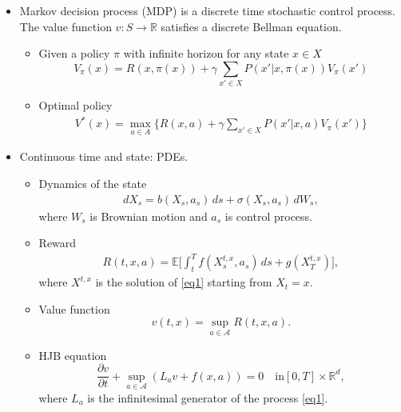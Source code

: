\documentclass{beamer}
\begin{document}
\begin{frame}
\begin{itemize}
\item Markov decision process (MDP) is a discrete time stochastic control process.   The value function $v:S\to \mathbb{R}$ satisfies a discrete Bellman equation.
\pause
\begin{itemize}
\item Given a policy $\pi$ with infinite horizon for any state $x\in X$
\begin{equation*}
V_\pi(x) = R(x,\pi(x)) + \gamma\sum_{x'\in X}P(x'|x,\pi(x))V_{\pi}(x')
\end{equation*}
\item Optimal policy
\begin{align*}
V^\ast(x) = \max_{a\in A}\{R(x,a) + \gamma\sum_{x'\in X}P(x'|x,a)V_{\pi}(x')\}
\end{align*}
\end{itemize}

\end{itemize} 
\end{frame}

\begin{frame}
\begin{itemize}
\item Continuous time and state: PDEs. 
\begin{itemize}
\item Dynamics of the state
\begin{align}\label{eq1}
dX_s = b(X_s,a_s)\,ds + \sigma(X_s,a_s)\,dW_s,
\end{align}
where $W_s$ is Brownian motion and $a_s$ is control process.
\pause
\item Reward 
\begin{align*}
R(t,x,a) = \mathbb{E}\big[\int_t^Tf(X_s^{t,x},a_s)\,ds + g(X_T^{t,x})\big],
\end{align*}
where $X^{t,x}$ is the solution of \eqref{eq1} starting from $X_t = x$.
\pause
\item Value function 
$$v(t,x) = \sup_{a\in \mathcal{A}}R(t,x,a).$$
\pause
\item HJB equation 
$$\frac{\partial v}{\partial t} + \sup_{a\in \mathcal{A}}(L_a v + f(x,a)) = 0\quad \text{in} [0,T]\times \mathbb{R}^d,$$
where $L_a$ is the infinitesimal generator of the process \eqref{eq1}. 
\end{itemize}
\end{itemize}

\end{frame}
\end{document}
